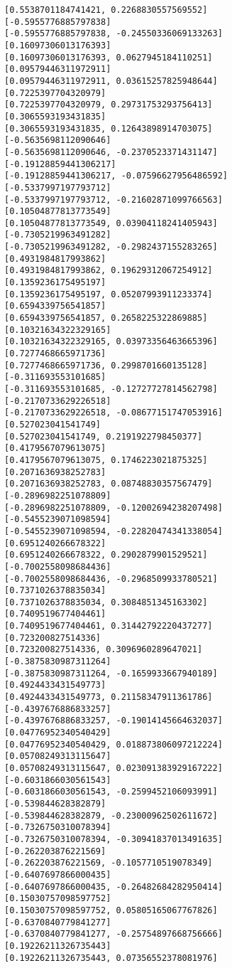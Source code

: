 \documentclass[11pt]{article}
\begin{document}
\begin{Verbatim}[commandchars=\\\{\}]
[0.5538701184741421, 0.2268830557569552]
[-0.5955776885797838]
[-0.5955776885797838, -0.24550336069133263]
[0.16097306013176393]
[0.16097306013176393, 0.0627945184110251]
[0.09579446311972911]
[0.09579446311972911, 0.03615257825948644]
[0.7225397704320979]
[0.7225397704320979, 0.29731753293756413]
[0.3065593193431835]
[0.3065593193431835, 0.12643898914703075]
[-0.5635698112090646]
[-0.5635698112090646, -0.2370523371431147]
[-0.19128859441306217]
[-0.19128859441306217, -0.07596627956486592]
[-0.5337997197793712]
[-0.5337997197793712, -0.21602871099766563]
[0.10504877813773549]
[0.10504877813773549, 0.03904118241405943]
[-0.7305219963491282]
[-0.7305219963491282, -0.2982437155283265]
[0.4931984817993862]
[0.4931984817993862, 0.19629312067254912]
[0.1359236175495197]
[0.1359236175495197, 0.05207993911233374]
[0.6594339756541857]
[0.6594339756541857, 0.2658225322869885]
[0.10321634322329165]
[0.10321634322329165, 0.03973356463665396]
[0.7277468665971736]
[0.7277468665971736, 0.2998701660135128]
[-0.311693553101685]
[-0.311693553101685, -0.12727727814562798]
[-0.2170733629226518]
[-0.2170733629226518, -0.08677151747053916]
[0.527023041541749]
[0.527023041541749, 0.2191922798450377]
[0.4179567079613075]
[0.4179567079613075, 0.1746223021875325]
[0.2071636938252783]
[0.2071636938252783, 0.08748830357567479]
[-0.2896982251078809]
[-0.2896982251078809, -0.12002694238207498]
[-0.5455239071098594]
[-0.5455239071098594, -0.22820474341338054]
[0.6951240266678322]
[0.6951240266678322, 0.2902879901529521]
[-0.7002558098684436]
[-0.7002558098684436, -0.2968509933780521]
[0.7371026378835034]
[0.7371026378835034, 0.3084851345163302]
[0.7409519677404461]
[0.7409519677404461, 0.31442792220437277]
[0.723200827514336]
[0.723200827514336, 0.3096960289647021]
[-0.3875830987311264]
[-0.3875830987311264, -0.1659933667940189]
[0.4924433431549773]
[0.4924433431549773, 0.21158347911361786]
[-0.4397676886833257]
[-0.4397676886833257, -0.19014145664632037]
[0.04776952340540429]
[0.04776952340540429, 0.018873806097212224]
[0.05708249313115647]
[0.05708249313115647, 0.023091383929167222]
[-0.6031866030561543]
[-0.6031866030561543, -0.2599452106093991]
[-0.539844628382879]
[-0.539844628382879, -0.23000962502611672]
[-0.7326750310078394]
[-0.7326750310078394, -0.30941837013491635]
[-0.262203876221569]
[-0.262203876221569, -0.1057710519078349]
[-0.6407697866000435]
[-0.6407697866000435, -0.26482684282950414]
[0.15030757098597752]
[0.15030757098597752, 0.05805165067767826]
[-0.6370840779841277]
[-0.6370840779841277, -0.25754897668756666]
[0.19226211326735443]
[0.19226211326735443, 0.07356552378081976]

\end{Verbatim}
\end{document}
